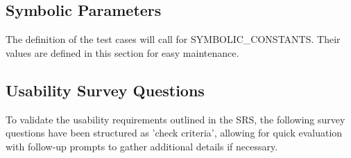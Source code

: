\documentclass[12pt, titlepage]{article}
\begin{document}
\subsection{Symbolic Parameters}

The definition of the test cases will call for SYMBOLIC\_CONSTANTS.
Their values are defined in this section for easy maintenance.

\subsection{Usability Survey Questions}

To validate the usability requirements outlined in the SRS, the following survey questions have been structured as 'check criteria', 
allowing for quick evaluation with follow-up prompts to gather additional details if necessary.
\end{document}
